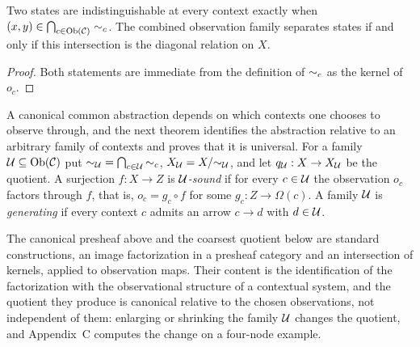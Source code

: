 \begin{proposition}\label{prop:globalindist}
Two states are indistinguishable at every context exactly when $(x,y)\in\bigcap_{c\in\mathrm{Ob}(\mathcal C)}\sim_c$. The combined observation family separates states if and only if this intersection is the diagonal relation on $X$.
\end{proposition}
\begin{proof}
Both statements are immediate from the definition of $\sim_c$ as the kernel of $o_c$.
\end{proof}

A canonical common abstraction depends on which contexts one chooses to observe through, and the next theorem identifies the abstraction relative to an arbitrary family of contexts and proves that it is universal. For a family $\mathcal U\subseteq\mathrm{Ob}(\mathcal C)$ put ${\sim_\mathcal U}=\bigcap_{c\in\mathcal U}{\sim_c}$, $X_\mathcal U=X/{\sim_\mathcal U}$, and let $q_\mathcal U:X\to X_\mathcal U$ be the quotient. A surjection $f:X\to Z$ is \emph{$\mathcal U$-sound} if for every $c\in\mathcal U$ the observation $o_c$ factors through $f$, that is, $o_c=g_c\circ f$ for some $g_c:Z\to\Omega(c)$. A family $\mathcal U$ is \emph{generating} if every context $c$ admits an arrow $c\to d$ with $d\in\mathcal U$.

The canonical presheaf above and the coarsest quotient below are standard constructions, an image factorization in a presheaf category and an intersection of kernels, applied to observation maps. Their content is the identification of the factorization with the observational structure of a contextual system, and the quotient they produce is canonical relative to the chosen observations, not independent of them: enlarging or shrinking the family $\mathcal U$ changes the quotient, and Appendix~C computes the change on a four-node example.


